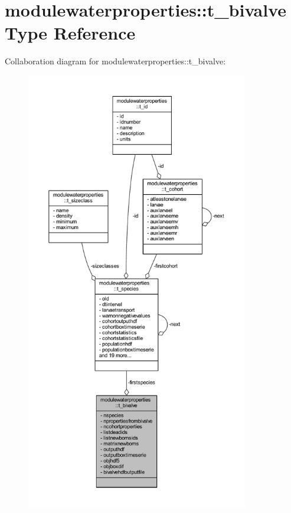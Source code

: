 \hypertarget{structmodulewaterproperties_1_1t__bivalve}{}\section{modulewaterproperties\+:\+:t\+\_\+bivalve Type Reference}
\label{structmodulewaterproperties_1_1t__bivalve}


Collaboration diagram for modulewaterproperties\+:\+:t\+\_\+bivalve\+:\nopagebreak
\begin{figure}[H]
\begin{center}
\leavevmode
\includegraphics[height=550pt]{structmodulewaterproperties_1_1t__bivalve__coll__graph}
\end{center}
\end{figure}
